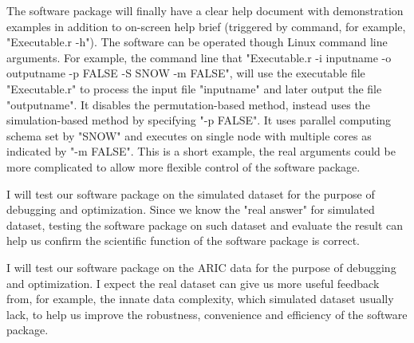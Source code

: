 \documentclass[12pt]{article}
\begin{document}
The software package will finally have a clear help document with demonstration examples in addition to on-screen help brief (triggered by command, for example, "Executable.r -h"). The software can be operated though Linux command line arguments. For example, the command line that "Executable.r -i inputname -o outputname -p FALSE -S SNOW -m FALSE", will use the executable file "Executable.r" to process the input file "inputname" and later output the file "outputname". It disables the permutation-based method, instead uses the simulation-based method by specifying "-p FALSE". It uses parallel computing schema set by "SNOW" and executes on single node with multiple cores as indicated by "-m FALSE". This is a short example, the real arguments could be more complicated to allow more flexible control of the software package.  

I will test our software package on the simulated dataset for the purpose of debugging and optimization. Since we know the "real answer" for simulated dataset, testing the software package on such dataset and evaluate the result can help us confirm the scientific function of the software package is correct.

I will test our software package on the ARIC data for the purpose of debugging and optimization. I expect the real dataset can give us more useful feedback from, for example, the innate data complexity, which simulated dataset usually lack, to help us improve the robustness, convenience and efficiency of the software package.

\end{document}
